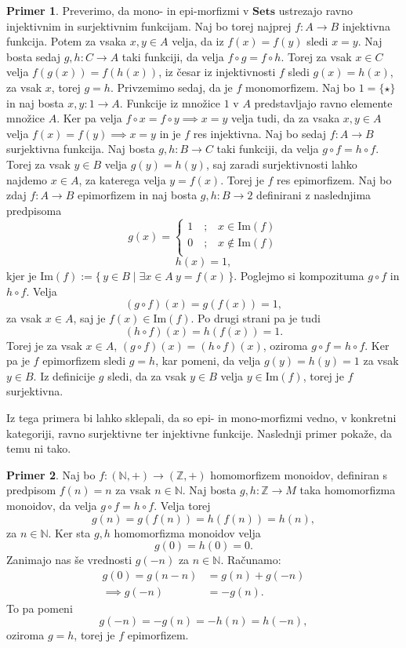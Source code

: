 \documentclass[12pt,a4paper]{book}
\theoremstyle{definition}
\theoremstyle{plain}
\theoremstyle{definition}
\newtheorem{primer}{Primer}[section]
\theoremstyle{remark}
\newcommand{\cat}[1]{\textbf{#1}}
\renewcommand{\set}[1]{\{\,#1\,\}}
\begin{document}
\begin{primer}
Preverimo, da mono- in epi-morfizmi v $\cat{Sets}$ ustrezajo ravno injektivnim in surjektivnim funkcijam. Naj bo torej najprej $f : A \to B$ injektivna funkcija. Potem za vsaka $x,y \in A$ velja, da iz $f(x) = f(y)$ sledi $x = y$. Naj bosta sedaj $g,h : C \to A$ taki funkciji, da velja $f \circ g = f \circ h$. Torej za vsak $x \in C$ velja $f(g(x)) = f(h(x))$, iz česar iz injektivnosti $f$ sledi $g(x) = h(x)$, za vsak $x$, torej $g = h$. 
Privzemimo sedaj, da je $f$ monomorfizem. Naj bo $1 = \{\star\}$ in naj bosta $x,y : 1 \to A$. Funkcije iz množice $1$ v $A$ predstavljajo ravno elemente množice $A$. Ker pa velja $f \circ x = f \circ y \implies x = y$ velja tudi, da za vsaka $x,y \in A$ velja $f(x) = f(y) \implies x = y$ in je $f$ res injektivna. Naj bo sedaj $f : A \rightarrow B$ surjektivna funkcija. Naj bosta $g,h : B \to C$ taki funkciji, da velja $g \circ f = h \circ f$. Torej za vsak $y \in B$ velja $g(y) = h(y)$, saj zaradi surjektivnosti lahko najdemo $x \in A$, za katerega velja $y = f(x)$. Torej je $f$ res epimorfizem. Naj bo zdaj $f : A \to B$ epimorfizem in naj bosta $g,h : B \to 2$ definirani z naslednjima predpisoma
\[
g(x)=
\begin{cases}
1 \quad\text{;}\quad x \in \mathrm{Im}(f) \\
0 \quad\text{;}\quad x \notin \mathrm{Im}(f) \\
\end{cases}
\]
$$ h(x) = 1,$$
kjer je $\mathrm{Im}(f) := \set{y \in B \mid \exists x \in A \ y = f(x)}$.
Poglejmo si kompozituma $g \circ f$ in $h \circ f$. Velja 
$$(g \circ f)(x) = g(f(x)) = 1,$$
za vsak $x \in A$, saj je $f(x) \in \mathrm{Im}(f)$. Po drugi strani pa je tudi 
$$(h \circ f)(x) = h(f(x)) = 1.$$
Torej je za vsak $x \in A$, $(g \circ f)(x) = (h \circ f)(x)$, oziroma $g\circ f = h\circ f$. Ker pa je $f$ epimorfizem sledi $g = h$, kar pomeni, da velja $g(y) = h(y) = 1$ za vsak $y \in B$. Iz definicije $g$ sledi, da za vsak $y \in B$ velja $y \in \mathrm{Im}(f)$, torej je $f$ surjektivna.
\end{primer}

Iz tega primera bi lahko sklepali, da so epi- in mono-morfizmi vedno, v konkretni kategoriji, ravno surjektivne ter injektivne funkcije. Naslednji primer pokaže, da temu ni tako.

\begin{primer}
Naj bo $f : (\mathbb{N},+) \to (\mathbb{Z},+)$ homomorfizem monoidov, definiran s predpisom $f(n) = n$ za vsak $n \in \mathbb{N}$. Naj bosta $g,h: \mathbb{Z} \to M$ taka homomorfizma monoidov, da velja $g \circ f = h \circ f$. 
Velja torej
$$g(n) = g(f(n)) = h(f(n)) = h(n),$$
za $n \in \mathbb{N}$.
Ker sta $g,h$ homomorfizma monoidov velja
$$g(0) = h(0) = 0.$$
Zanimajo nas še vrednosti $g(-n)$ za $n \in \mathbb{N}$. 
Računamo:
\begin{align*}
g(0) = g(n - n) &= g(n) + g(-n) \\
\implies g(-n) &= -g(n).
\end{align*}
To pa pomeni
$$g(-n) = -g(n) = -h(n) = h(-n),$$
%
oziroma $g = h$, torej je $f$ epimorfizem.
\end{primer}
\end{document}
